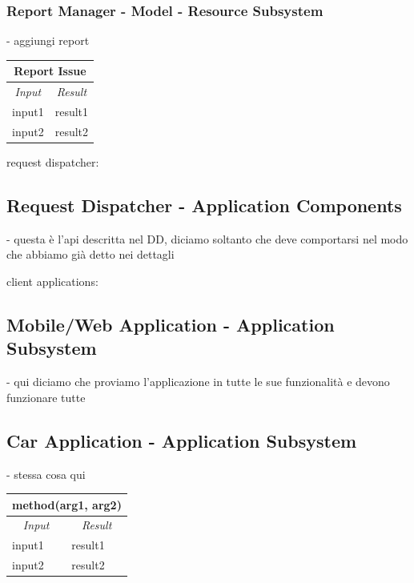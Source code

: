 \documentclass[english]{article}
\begin{document}
\subsubsection{Report Manager - Model - Resource Subsystem}
- aggiungi report

\begin{center}
	\begin{tabular}{ | m{6cm} | m{6cm} | }
		\hline
		\multicolumn{2}{|c|}{\textbf{Report Issue}} \\
		\hline
		\multicolumn{1}{|c|}{\textit{Input}} & \multicolumn{1}{c|}{\textit{Result}} \\
		\hline
		input1 & result1 \\
		\hline
		input2 & result2 \\
		\hline
	\end{tabular}
\end{center}

request dispatcher:
\subsection{Request Dispatcher - Application Components}
- questa è l'api descritta nel DD, diciamo soltanto che deve comportarsi nel modo che abbiamo già detto nei dettagli

client applications:
\subsection{Mobile/Web Application - Application Subsystem}
- qui diciamo che proviamo l'applicazione in tutte le sue funzionalità e devono funzionare tutte

\subsection{Car Application - Application Subsystem}
- stessa cosa qui

\begin{center}
	\begin{tabular}{ | m{6cm} | m{6cm} | }
		\hline
		\multicolumn{2}{|c|}{\textbf{method(arg1, arg2)}} \\
		\hline
		\multicolumn{1}{|c|}{\textit{Input}} & \multicolumn{1}{c|}{\textit{Result}} \\
		\hline
		input1 & result1 \\
		\hline
		input2 & result2 \\
		\hline
	\end{tabular}
\end{center}
\end{document}
